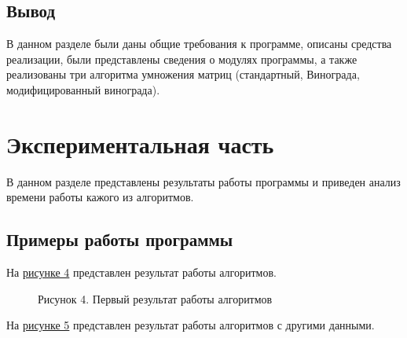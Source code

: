 \documentclass[12pt]{report}
\begin{document}
	\section{Вывод}
	В данном разделе были даны общие требования к программе, описаны средства реализации, были представлены сведения о модулях программы, а также реализованы три алгоритма умножения матриц (стандартный, Винограда, модифицированный винограда).
	
	\chapter{Экспериментальная часть}
	В данном разделе представлены результаты работы программы и приведен анализ времени работы кажого из алгоритмов.
	\section{Примеры работы программы}
	На \hyperref[Result1]{рисунке 4} представлен результат работы алгоритмов.
	\begin{figure}[h!]\label{Result1}
		\caption*{Рисунок 4. Первый результат работы алгоритмов}
	\end{figure}
	\newpage
	На \hyperref[Result2]{рисунке 5} представлен результат работы алгоритмов с другими данными.
\end{document}
